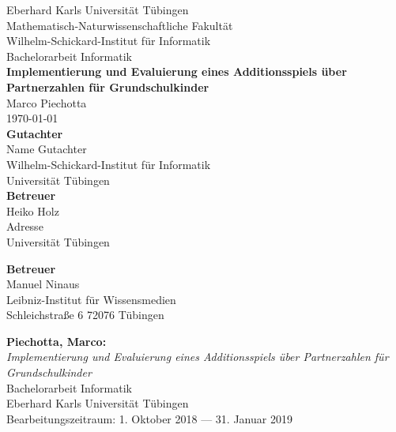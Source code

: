 \documentclass[twoside,12pt,a4paper]{scrreprt}
\begin{document}
\begin{titlepage}
\begin{center}
\LARGE Eberhard Karls Universität Tübingen\\
\large Mathematisch-Naturwissenschaftliche Fakultät \\
Wilhelm-Schickard-Institut für Informatik\\
[3cm]
\huge Bachelorarbeit Informatik\\
[2cm]
\Large\textbf{Implementierung und Evaluierung eines Additionsspiels über Partnerzahlen für Grundschulkinder}\\
[1.5cm]
\large Marco Piechotta\\
[0.5cm]
\today
\\
\vfill
\small\textbf{Gutachter}\\[0.3cm]
\large Name Gutachter\\
\footnotesize Wilhelm-Schickard-Institut für Informatik\\Universität Tübingen\\
[1cm]

\small\textbf{Betreuer}\\[0.3cm]
\large Heiko Holz\\
\footnotesize Adresse\\
Universität Tübingen

\small\textbf{Betreuer}\\[0.3cm]
\large Manuel Ninaus\\
\footnotesize Leibniz-Institut für Wissensmedien\\
Schleichstraße 6
72076 Tübingen
\end{center}
\end{titlepage}

\thispagestyle{empty}
\vspace*{\fill}
\textbf{Piechotta, Marco:}\\
\emph{Implementierung und Evaluierung eines Additionsspiels über Partnerzahlen für Grundschulkinder}\\
Bachelorarbeit Informatik\\
Eberhard Karls Universität Tübingen\\
Bearbeitungszeitraum: 1. Oktober 2018 --- 31. Januar 2019
\newpage


\newpage

\tableofcontents\label{toc}
\cleardoublepage
\end{document}
